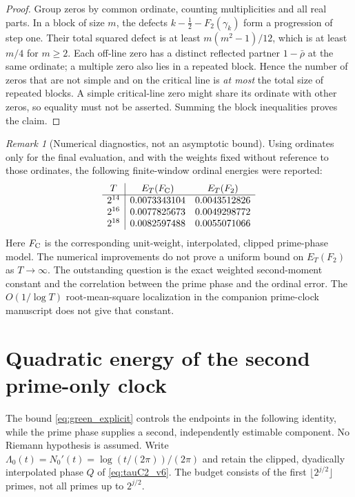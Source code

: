 \documentclass[11pt,reqno]{amsart}
\numberwithin{equation}{section}
\theoremstyle{definition}
\theoremstyle{remark}
\newtheorem{remark}[theorem]{Remark}
\begin{document}
\begin{proof}
Group zeros by common ordinate, counting multiplicities
and all real parts. In a block of size $m$, the defects
$k-\frac12-F_2(\gamma_k)$ form a progression of step one.
Their total squared defect is at least $m(m^2-1)/12$,
which is at least $m/4$ for $m\ge2$.
Each off-line zero has a distinct reflected partner
$1-\bar\rho$ at the same ordinate; a multiple zero
also lies in a repeated block. Hence the number of zeros
that are not simple and on the critical line is \emph{at
most} the total size of repeated blocks.
A simple critical-line zero might share its ordinate
with other zeros, so equality must not be asserted.
Summing the block inequalities proves the claim.
\end{proof}

\begin{remark}[Numerical diagnostics, not an asymptotic bound]
\label{rem:tauC2_data_v6}
Using ordinates only for the final evaluation, and with
the weights fixed without reference to those ordinates,
the following finite-window ordinal energies were reported:
\[
\begin{array}{c|cc}
T&E_T(F_{\rm C})&E_T(F_2)\\\hline
2^{14}&0.0073343104&0.0043512826\\
2^{16}&0.0077825673&0.0049298772\\
2^{18}&0.0082597488&0.0055071066
\end{array}
\]
Here $F_{\rm C}$ is the corresponding unit-weight,
interpolated, clipped prime-phase model.
The numerical improvements do not prove a uniform
bound on $E_T(F_2)$ as $T\to\infty$.
The outstanding question is the exact weighted
second-moment constant and the correlation between
the prime phase and the ordinal error.
The $O(1/\log T)$ root-mean-square localization
in the companion prime-clock manuscript does not
give that constant.
\end{remark}


\section{Quadratic energy of the second prime-only clock}\label{sec:tauC2_energy_v7}
The bound \eqref{eq:green_explicit} controls the endpoints in the
following identity, while the prime phase supplies a second,
independently estimable component. No Riemann hypothesis is assumed.
Write $\Lambda_0(t)=N_0'(t)=\log(t/(2\pi))/(2\pi)$ and retain
the clipped, dyadically interpolated phase $Q$ of
\eqref{eq:tauC2_v6}. The budget consists of the first
$\lfloor2^{j/2}\rfloor$ primes, not all primes up to $2^{j/2}$.
\end{document}
